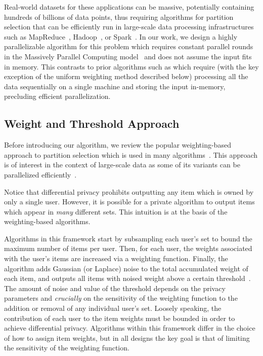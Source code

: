 Real-world datasets for these applications can be massive, potentially containing hundreds of billions of data points, thus requiring algorithms for partition selection that can be efficiently run in large-scale data processing infrastructures such as MapReduce~\cite{dean2004mapreduce}, Hadoop~\cite{hadoop}, or Spark~\cite{zaharia2016spark}. In our work, we design a highly parallelizable algorithm for this problem which requires constant parallel rounds in the Massively Parallel Computing model~\cite{karloff2010model} and does not assume the input fits in memory.  This contrasts to prior algorithms such as \cite{gopi2020dpunion, carvalho2022incorporatingitem} which require (with the key exception of the uniform weighting method described below) processing all the data sequentially on a single machine and storing the input in-memory, precluding efficient parallelization.

\subsection{Weight and Threshold Approach}
Before introducing our algorithm, we review the popular weighting-based approach to partition selection which is used in many algorithms~\cite{korolova2009releasing, gopi2020dpunion, carvalho2022incorporatingitem, swanberg2023dpsips}. This approach is of interest in the context of large-scale data as some of its variants can be parallelized efficiently~\cite{korolova2009releasing,swanberg2023dpsips}. 

Notice that differential privacy prohibits outputting any item which is owned by only a single user. However, it is possible for a private algorithm to output items which appear in {\it many} different sets. This intuition is at the basis of the weighting-based algorithms.

Algorithms in this framework start by subsampling each user's set to bound the maximum number of items per user. Then, for each user, the weights associated with the user's items are increased via a weighting function. Finally, the algorithm adds Gaussian (or Laplace) noise to the total accumulated weight of each item, and outputs all items with noised weight above a certain threshold~\cite{korolova2009releasing, gopi2020dpunion, carvalho2022incorporatingitem, swanberg2023dpsips}. The amount of noise and value of the threshold depends on the privacy parameters and  \emph{crucially} on the sensitivity of the weighting function to the addition or removal of any individual user's set. Loosely speaking, the contribution of each user to the item weights must be bounded in order to achieve differential privacy. Algorithms within this framework differ in the choice of how to assign item weights, but in all designs the key goal is that of limiting the sensitivity of the weighting function.

